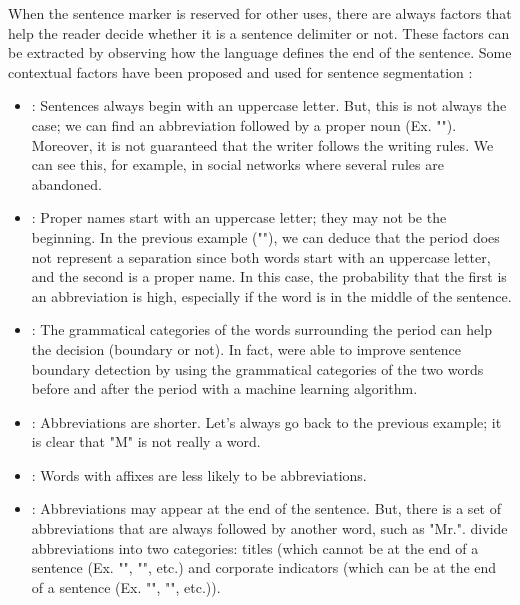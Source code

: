 \documentclass{KBook}
\begin{document}
When the sentence marker is reserved for other uses, there are always factors that help the reader decide whether it is a sentence delimiter or not. 
These factors can be extracted by observing how the language defines the end of the sentence. 
Some contextual factors have been proposed and used for sentence segmentation \cite{10-palmer}:
\begin{itemize}
	\item {}: Sentences always begin with an uppercase letter. 
	But, this is not always the case; we can find an abbreviation followed by a proper noun (Ex. ""). 
	Moreover, it is not guaranteed that the writer follows the writing rules. 
	We can see this, for example, in social networks where several rules are abandoned.
	
	\item {}: Proper names start with an uppercase letter; they may not be the beginning. 
	In the previous example (""), we can deduce that the period does not represent a separation since both words start with an uppercase letter, and the second is a proper name. 
	In this case, the probability that the first is an abbreviation is high, especially if the word is in the middle of the sentence.
	
	\item {}: The grammatical categories of the words surrounding the period can help the decision (boundary or not). 
	In fact, \citet{97-palmer-hearst} were able to improve sentence boundary detection by using the grammatical categories of the two words before and after the period with a machine learning algorithm. 
	
	\item {}: Abbreviations are shorter. 
	Let's always go back to the previous example; it is clear that "M" is not really a word.
	
	\item {}: Words with affixes are less likely to be abbreviations.
	
	\item {}: Abbreviations may appear at the end of the sentence. 
	But, there is a set of abbreviations that are always followed by another word, such as "Mr.".
	\citet{89-riley,97-reynar-ratnaparkhi} divide abbreviations into two categories: titles (which cannot be at the end of a sentence (Ex. "", "", etc.) and corporate indicators (which can be at the end of a sentence (Ex. "", "", etc.)).
\end{itemize}
\end{document}
